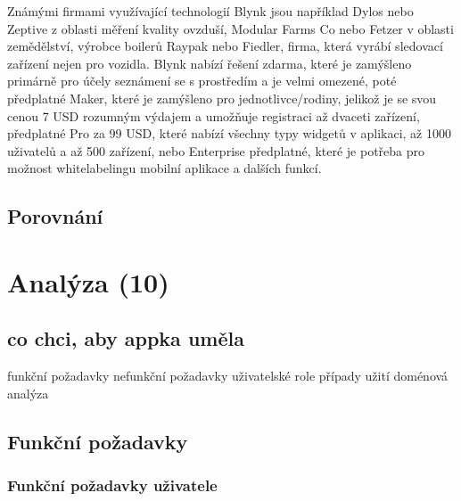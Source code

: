 Známými firmami využívající technologií Blynk jsou například Dylos nebo Zeptive z oblasti měření kvality ovzduší, Modular Farms Co nebo Fetzer v oblasti zemědělství, výrobce boilerů Raypak nebo Fiedler, firma, která vyrábí sledovací zařízení nejen pro vozidla.
Blynk nabízí řešení zdarma, které je zamýšleno primárně pro účely seznámení se s prostředím a je velmi omezené, poté předplatné Maker, které je zamýšleno pro jednotlivce/rodiny, jelikož je se svou cenou 7 USD rozumným výdajem a umožňuje registraci až dvaceti zařízení, předplatné Pro za 99 USD, které nabízí všechny typy widgetů v aplikaci, až 1000 uživatelů a až 500 zařízení, nebo Enterprise předplatné, které je potřeba pro možnost whitelabelingu mobilní aplikace a dalších funkcí.


\section{Porovnání}

\chapter{Analýza (10)}

\section{co chci, aby appka uměla}

funkční požadavky
nefunkční požadavky
uživatelské role
případy užití
doménová analýza

\section{Funkční požadavky}

\subsection{Funkční požadavky uživatele}

